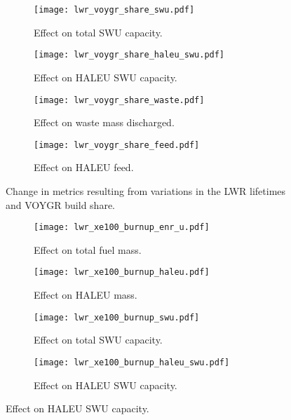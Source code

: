 \begin{figure}   
    \begin{subfigure}[b]{0.48\textwidth}
        \centering
        \texttt{[image: lwr\_voygr\_share\_swu.pdf]}
        \caption{Effect on total SWU capacity.}
        \label{fig:lwr_voygr_share_swu}
    \end{subfigure}
    \hfill
    \begin{subfigure}[b]{0.48\textwidth}
        \centering
        \texttt{[image: lwr\_voygr\_share\_haleu\_swu.pdf]}
        \caption{Effect on HALEU SWU capacity.}
        \label{fig:lwr_voygr_share_haleu_swu}
    \end{subfigure}   
    \begin{subfigure}[b]{0.48\textwidth}
        \centering
        \texttt{[image: lwr\_voygr\_share\_waste.pdf]}
        \caption{Effect on waste mass discharged.}
        \label{fig:lwr_voygr_share_waste}
    \end{subfigure}
    \hfill
    \begin{subfigure}[b]{0.48\textwidth}
        \centering
        \texttt{[image: lwr\_voygr\_share\_feed.pdf]}
        \caption{Effect on HALEU feed.}
        \label{fig:lwr_voygr_share_feed}
    \end{subfigure}
    \caption{Change in metrics resulting from variations in the 
    LWR lifetimes and VOYGR build share.}
    \label{fig:lwr_voygr_share}
\end{figure}

\begin{figure}
    \begin{subfigure}[b]{0.48\textwidth}
        \centering
        \texttt{[image: lwr\_xe100\_burnup\_enr\_u.pdf]}
        \caption{Effect on total fuel mass.}
        \label{fig:lwr_xe100_burnup_enr_u}
    \end{subfigure}
    \hfill
    \begin{subfigure}[b]{0.48\textwidth}
        \centering
        \texttt{[image: lwr\_xe100\_burnup\_haleu.pdf]}
        \caption{Effect on HALEU mass.}
        \label{fig:lwr_xe100_burnup_haleu}
    \end{subfigure}
    
    \begin{subfigure}[b]{0.48\textwidth}
        \centering
        \texttt{[image: lwr\_xe100\_burnup\_swu.pdf]}
        \caption{Effect on total SWU capacity.}
        \label{fig:lwr_xe100_burnup_swu}
    \end{subfigure}
    \hfill
    \begin{subfigure}[b]{0.48\textwidth}
        \centering
        \texttt{[image: lwr\_xe100\_burnup\_haleu\_swu.pdf]}
        \caption{Effect on HALEU SWU capacity.}
        \label{fig:lwr_xe100_burnup_haleu_swu}
    \end{subfigure}
\end{figure}

